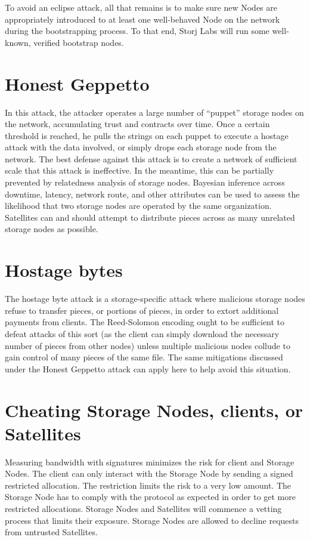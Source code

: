 \documentclass[8pt,fleqn,openany]{book}
\begin{document}
To avoid an eclipse attack, all that remains
is to make sure new Nodes are appropriately introduced to at least one
well-behaved Node on the network during the bootstrapping process.
To that end, Storj Labs will run some well-known, verified bootstrap nodes.

\section{Honest Geppetto}

In this attack,
the attacker operates a large number of ``puppet'' storage nodes on the network,
accumulating trust and contracts over time. Once a certain threshold is reached,
he pulls the strings on each puppet to execute a hostage attack with the data
involved, or simply drops each storage node from the network. The best defense
against this attack is to create a network of sufficient scale that this attack
is ineffective. In the meantime, this can be partially prevented by relatedness
analysis of storage nodes. Bayesian inference across downtime, latency, network
route, and other
attributes can be used to assess the likelihood that two storage nodes are
operated by the same organization. Satellites can and should attempt to
distribute pieces across as many unrelated storage nodes as possible.

\section{Hostage bytes}

The hostage byte attack is a storage-specific attack where malicious storage
nodes
refuse to transfer pieces, or portions of pieces, in order to extort additional
payments from clients. The Reed-Solomon encoding ought to be sufficient to
defeat attacks of this sort (as the client can simply download the necessary
number of pieces from other nodes) unless multiple malicious nodes collude to
gain control of many pieces of the same file. The same mitigations discussed
under the Honest Geppetto attack can apply here to help avoid this situation.

\section{Cheating Storage Nodes, clients, or Satellites}

Measuring bandwidth with signatures minimizes the risk for client and Storage
Nodes.
The client can only interact with the Storage Node by sending a signed
restricted allocation.
The restriction limits the risk to a very low amount.
The Storage Node has to comply with the protocol as expected in order to get
more restricted allocations.
Storage Nodes and Satellites will commence a vetting process that limits their
exposure.
Storage Nodes are allowed to decline requests from untrusted Satellites.
\end{document}

